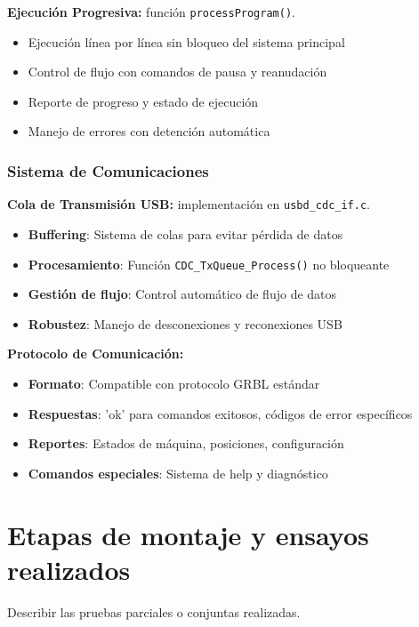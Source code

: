 \documentclass[12pt]{article}
\begin{document}
\textbf{Ejecución Progresiva:} función \texttt{processProgram()}.

\begin{itemize}
    \item Ejecución línea por línea sin bloqueo del sistema principal
    \item Control de flujo con comandos de pausa y reanudación
    \item Reporte de progreso y estado de ejecución
    \item Manejo de errores con detención automática
\end{itemize}

\subsubsection{Sistema de Comunicaciones}

\textbf{Cola de Transmisión USB:} implementación en \texttt{usbd\_cdc\_if.c}.

\begin{itemize}
    \item \textbf{Buffering}: Sistema de colas para evitar pérdida de datos
    \item \textbf{Procesamiento}: Función \texttt{CDC\_TxQueue\_Process()} no bloqueante
    \item \textbf{Gestión de flujo}: Control automático de flujo de datos
    \item \textbf{Robustez}: Manejo de desconexiones y reconexiones USB
\end{itemize}

\textbf{Protocolo de Comunicación:}
\begin{itemize}
    \item \textbf{Formato}: Compatible con protocolo GRBL estándar
    \item \textbf{Respuestas}: 'ok' para comandos exitosos, códigos de error específicos
    \item \textbf{Reportes}: Estados de máquina, posiciones, configuración
    \item \textbf{Comandos especiales}: Sistema de help y diagnóstico
\end{itemize}



\section{Etapas de montaje y ensayos realizados}
Describir las pruebas parciales o conjuntas realizadas.
\end{document}
